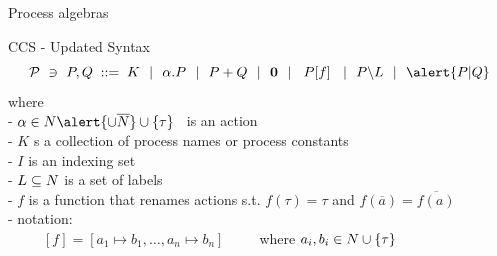 \documentclass[aspectratio=169]{beamer}
\begin{document}
\begin{slide}{Process algebras}
\small

\begin{block}{CCS - \alert{Updated} Syntax}
\begin{equation*}
\mathcal{P} ~\ni~ P,Q\; ::=\; K ~~|~~ \alpha.P ~~|~~ P + Q ~~|~~ \cnil
        ~~|~~ \crn P f  ~~|~~ P\backslash L ~~|~~ \alert{P|Q}
\end{equation*}
%
where
\\- $\alpha \in \Act \alert{\cup \overline\Act}
    \cup \set{\tau}$~ is an action
\\- $K$ s a collection of process names or process constants
\\- $I$ is an indexing set
\\- $L \subseteq \Act %
    $ is a set of labels
\\- $f$ is a function that renames actions s.t. $f(\tau) = \tau$  \alert{and $f(\overline{a}) = \overline{f(a)}$}
\\- notation:
\\~~~~~$[f] = [a_1\mapsto b_1,\ldots,a_n \mapsto b_n]$~~~~~where \alert{$a_i,b_i \in N \cup \left\{ \tau \right\}$}
\end{block}
\end{slide}

\end{document}
